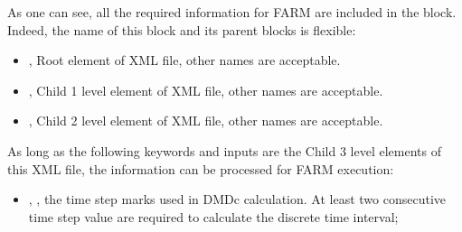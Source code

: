 As one can see, all the required information for FARM are included in the  block. 
Indeed, the name of this block and its parent blocks is flexible:
\begin{itemize}
  \item {}, Root element of XML file, other names are acceptable.
  \item {}, Child 1 level element of XML file, other names are acceptable.
  \item {}, Child 2 level element of XML file, other names are acceptable.
\end{itemize}

As long as the following keywords and inputs are the Child 3 level elements of this XML file, the information can 
be processed for FARM execution:
\begin{itemize}
  \item {}, , 
  the time step marks used in DMDc calculation. 
  At least two consecutive time step value are required to calculate the discrete time interval;
\end{itemize}

